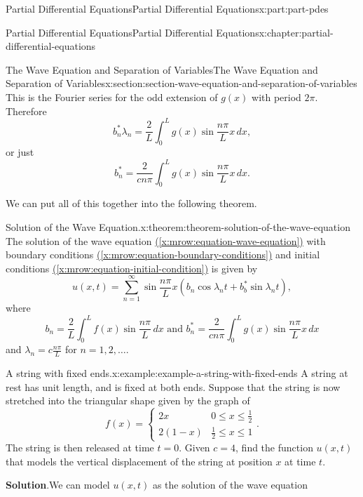 \documentclass[twoside,10pt,]{book}
\newcommand{\blocktitlefont}{\relax}
\newcommand{\xreffont}{\relax}
\numberwithin{equation}{part}
\newcommand{\amp}{&}
\begin{document}
\begin{partptx}{Partial Differential Equations}{}{Partial Differential Equations}{}{}{x:part:part-pdes}
\begin{chapterptx}{Partial Differential Equations}{}{Partial Differential Equations}{}{}{x:chapter:partial-differential-equations}
\begin{sectionptx}{The Wave Equation and Separation of Variables}{}{The Wave Equation and Separation of Variables}{}{}{x:section:section-wave-equation-and-separation-of-variables}
This is the Fourier series for the odd extension of \(g(x)\) with period \(2\pi\). Therefore%
\begin{equation*}
b^{*}_{n}\lambda_{n} = \frac{2}{L}\int_{0}^{L}g(x)\sin\frac{n\pi}{L}x\,dx,
\end{equation*}
or just%
\begin{equation*}
b^{*}_{n} = \frac{2}{cn\pi}\int_{0}^{L}g(x)\sin\frac{n\pi}{L}x\,dx.
\end{equation*}
%
\par
We can put all of this together into the following theorem.%
\begin{theorem}{Solution of the Wave Equation.}{}{x:theorem:theorem-solution-of-the-wave-equation}%
%
The solution of the wave equation \hyperref[x:mrow:equation-wave-equation]{({\xreffont\ref{x:mrow:equation-wave-equation}})} with boundary conditions \hyperref[x:mrow:equation-boundary-conditions]{({\xreffont\ref{x:mrow:equation-boundary-conditions}})} and initial conditions \hyperref[x:mrow:equation-initial-condition]{({\xreffont\ref{x:mrow:equation-initial-condition}})} is given by%
\begin{equation*}
u(x,t) = \sum_{n=1}^{\infty}\sin\frac{n\pi}{L}x(b_{n}\cos\lambda_{n}t+b^{*}_{b}\sin\lambda_{n}t),
\end{equation*}
where%
\begin{equation*}
b_{n} = \frac{2}{L}\int_{0}^{L}f(x)\sin\frac{n\pi}{L}\,dx\text{ and }b^{*}_{n} = \frac{2}{cn\pi}\int_{0}^{L}g(x)\sin\frac{n\pi}{L}x\,dx
\end{equation*}
and \(\lambda_{n} = c\frac{n\pi}{L}\) for \(n=1,2,\ldots\).%
\end{theorem}
\begin{example}{A string with fixed ends.}{x:example:example-a-string-with-fixed-ends}%
A string at rest has unit length, and is fixed at both ends. Suppose that the string is now stretched into the triangular shape given by the graph of%
\begin{equation*}
f(x) = \begin{cases} 2x \amp 0\leq x\leq \frac{1}{2} \\ 2(1-x) \amp \frac{1}{2}\leq x\leq 1 \end{cases}.
\end{equation*}
The string is then released at time \(t=0\). Given \(c=4\), find the function \(u(x,t)\) that models the vertical displacement of the string at position \(x\) at time \(t\).%
\par\smallskip%
\noindent\textbf{\blocktitlefont Solution}.\hypertarget{g:solution:idp105548818167968}{}\quad{}We can model \(u(x,t)\) as the solution of the wave equation%

\end{example}
\end{sectionptx}
\end{chapterptx}
\end{partptx}
\end{document}
